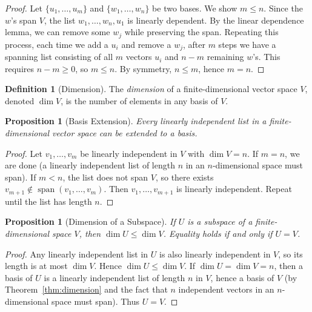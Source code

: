 \documentclass[11pt,a4paper]{article}
\theoremstyle{definition}
\newtheorem{definition}{Definition}[section]
\theoremstyle{plain}
\newtheorem{proposition}[theorem]{Proposition}
\theoremstyle{remark}
\DeclareMathOperator{\Span}{span}
\begin{document}
\begin{proof}
Let $\{u_1, \ldots, u_m\}$ and $\{w_1, \ldots, w_n\}$ be two bases. We show $m \leq n$.
Since the $w$'s span $V$, the list $w_1, \ldots, w_n, u_1$ is linearly dependent. By the
linear dependence lemma, we can remove some $w_j$ while preserving the span. Repeating this
process, each time we add a $u_i$ and remove a $w_j$, after $m$ steps we have a spanning list
consisting of all $m$ vectors $u_i$ and $n - m$ remaining $w$'s. This requires $n - m \geq 0$,
so $m \leq n$. By symmetry, $n \leq m$, hence $m = n$.
\end{proof}

\begin{definition}[Dimension]
\label{def:dimension}
The \emph{dimension} of a finite-dimensional vector space $V$, denoted $\dim V$, is the
number of elements in any basis of $V$.
\end{definition}

\begin{proposition}[Basis Extension]
\label{prop:basis_extension}
Every linearly independent list in a finite-dimensional vector space can be extended to a basis.
\end{proposition}

\begin{proof}
Let $v_1, \ldots, v_m$ be linearly independent in $V$ with $\dim V = n$. If $m = n$, we
are done (a linearly independent list of length $n$ in an $n$-dimensional space must span).
If $m < n$, the list does not span $V$, so there exists $v_{m+1} \notin \Span(v_1, \ldots, v_m)$.
Then $v_1, \ldots, v_{m+1}$ is linearly independent. Repeat until the list has length $n$.
\end{proof}

\begin{proposition}[Dimension of a Subspace]
\label{prop:dim_subspace}
If $U$ is a subspace of a finite-dimensional space $V$, then $\dim U \leq \dim V$.
Equality holds if and only if $U = V$.
\end{proposition}

\begin{proof}
Any linearly independent list in $U$ is also linearly independent in $V$, so its length
is at most $\dim V$. Hence $\dim U \leq \dim V$. If $\dim U = \dim V = n$, then a basis
of $U$ is a linearly independent list of length $n$ in $V$, hence a basis of $V$
(by Theorem~\ref{thm:dimension} and the fact that $n$ independent vectors in an
$n$-dimensional space must span). Thus $U = V$.
\end{proof}
\end{document}
